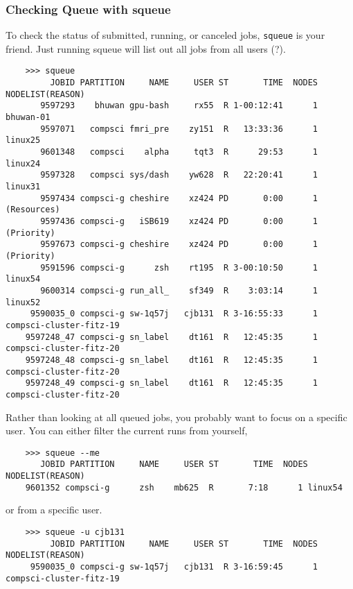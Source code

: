 \subsubsection{Checking Queue with squeue}

  To check the status of submitted, running, or canceled jobs, \texttt{squeue} is your friend. Just running squeue will list out all jobs from all users (?).  

  \begin{lstlisting}
    >>> squeue           
         JOBID PARTITION     NAME     USER ST       TIME  NODES NODELIST(REASON)
       9597293    bhuwan gpu-bash     rx55  R 1-00:12:41      1 bhuwan-01
       9597071   compsci fmri_pre    zy151  R   13:33:36      1 linux25
       9601348   compsci    alpha     tqt3  R      29:53      1 linux24
       9597328   compsci sys/dash    yw628  R   22:20:41      1 linux31
       9597434 compsci-g cheshire    xz424 PD       0:00      1 (Resources)
       9597436 compsci-g   iSB619    xz424 PD       0:00      1 (Priority)
       9597673 compsci-g cheshire    xz424 PD       0:00      1 (Priority)
       9591596 compsci-g      zsh    rt195  R 3-00:10:50      1 linux54
       9600314 compsci-g run_all_    sf349  R    3:03:14      1 linux52
     9590035_0 compsci-g sw-1q57j   cjb131  R 3-16:55:33      1 compsci-cluster-fitz-19
    9597248_47 compsci-g sn_label    dt161  R   12:45:35      1 compsci-cluster-fitz-20
    9597248_48 compsci-g sn_label    dt161  R   12:45:35      1 compsci-cluster-fitz-20
    9597248_49 compsci-g sn_label    dt161  R   12:45:35      1 compsci-cluster-fitz-20 
  \end{lstlisting} 

  Rather than looking at all queued jobs, you probably want to focus on a specific user. You can either filter the current runs from yourself, 

  \begin{lstlisting}
    >>> squeue --me      
       JOBID PARTITION     NAME     USER ST       TIME  NODES NODELIST(REASON)
    9601352 compsci-g      zsh    mb625  R       7:18      1 linux54 
  \end{lstlisting}

  or from a specific user. 

  \begin{lstlisting}
    >>> squeue -u cjb131
         JOBID PARTITION     NAME     USER ST       TIME  NODES NODELIST(REASON)
     9590035_0 compsci-g sw-1q57j   cjb131  R 3-16:59:45      1 compsci-cluster-fitz-19 
  \end{lstlisting} 

